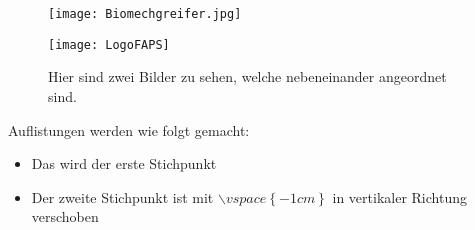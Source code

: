 \begin{figure}[ht!]

\newcommand{\pictureheight}{5cm}

	\begin{minipage}[c]{.49\textwidth}
		\centering
		\texttt{[image: Biomechgreifer.jpg]}
		\label{Bild_Beispiel_zwei_Bilder_links}
	\end{minipage}
%	
	\begin{minipage}[c]{.49\textwidth}
    		\centering
		\texttt{[image: LogoFAPS]}
		\label{Bild_Beispiel_zwei_Bilder_rechts}
	\end{minipage}
    	
    	\caption[Zwei Bilder nebeneinander]{Hier sind zwei Bilder zu sehen, welche nebeneinander angeordnet sind.}
	\label{Bild_Beispiel_zwei_Bilder}

\end{figure}

Auflistungen werden wie folgt gemacht:
\begin{itemize}
	\item Das wird der erste Stichpunkt \\ \vspace{-1cm}
	\item Der zweite Stichpunkt ist mit $\backslash\!vspace\left\{ -1cm \right\}$ in vertikaler Richtung verschoben \\ \vspace{-1cm}
\end{itemize}